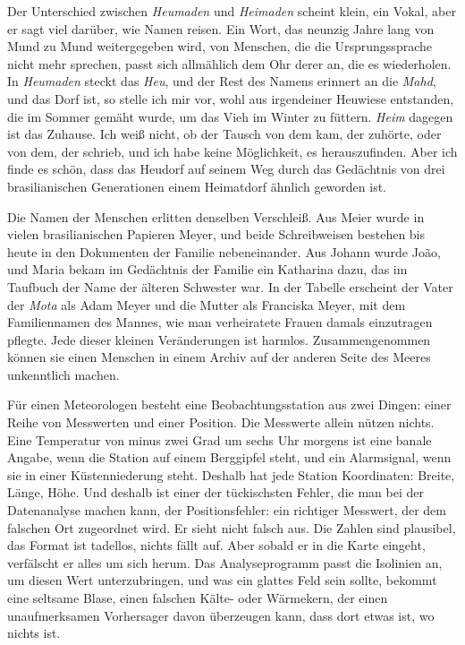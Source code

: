 \documentclass[
  ngerman,
  11pt,
  openany]{book}
\begin{document}
Der Unterschied zwischen \emph{Heumaden} und \emph{Heimaden} scheint
klein, ein Vokal, aber er sagt viel darüber, wie Namen reisen. Ein Wort,
das neunzig Jahre lang von Mund zu Mund weitergegeben wird, von
Menschen, die die Ursprungssprache nicht mehr sprechen, passt sich
allmählich dem Ohr derer an, die es wiederholen. In \emph{Heumaden}
steckt das \emph{Heu}, und der Rest des Namens erinnert an die
\emph{Mahd}, und das Dorf ist, so stelle ich mir vor, wohl aus
irgendeiner Heuwiese entstanden, die im Sommer gemäht wurde, um das Vieh
im Winter zu füttern. \emph{Heim} dagegen ist das Zuhause. Ich weiß
nicht, ob der Tausch von dem kam, der zuhörte, oder von dem, der
schrieb, und ich habe keine Möglichkeit, es herauszufinden. Aber ich
finde es schön, dass das Heudorf auf seinem Weg durch das Gedächtnis von
drei brasilianischen Generationen einem Heimatdorf ähnlich geworden ist.

Die Namen der Menschen erlitten denselben Verschleiß. Aus Meier wurde in
vielen brasilianischen Papieren Meyer, und beide Schreibweisen bestehen
bis heute in den Dokumenten der Familie nebeneinander. Aus Johann wurde
João, und Maria bekam im Gedächtnis der Familie ein Katharina dazu, das
im Taufbuch der Name der älteren Schwester war. In der Tabelle erscheint
der Vater der \emph{Mota} als Adam Meyer und die Mutter als Franciska
Meyer, mit dem Familiennamen des Mannes, wie man verheiratete Frauen
damals einzutragen pflegte. Jede dieser kleinen Veränderungen ist
harmlos. Zusammengenommen können sie einen Menschen in einem Archiv auf
der anderen Seite des Meeres unkenntlich machen.

Für einen Meteorologen besteht eine Beobachtungsstation aus zwei Dingen:
einer Reihe von Messwerten und einer Position. Die Messwerte allein
nützen nichts. Eine Temperatur von minus zwei Grad um sechs Uhr morgens
ist eine banale Angabe, wenn die Station auf einem Berggipfel steht, und
ein Alarmsignal, wenn sie in einer Küstenniederung steht. Deshalb hat
jede Station Koordinaten: Breite, Länge, Höhe. Und deshalb ist einer der
tückischsten Fehler, die man bei der Datenanalyse machen kann, der
Positionsfehler: ein richtiger Messwert, der dem falschen Ort zugeordnet
wird. Er sieht nicht falsch aus. Die Zahlen sind plausibel, das Format
ist tadellos, nichts fällt auf. Aber sobald er in die Karte eingeht,
verfälscht er alles um sich herum. Das Analyseprogramm passt die
Isolinien an, um diesen Wert unterzubringen, und was ein glattes Feld
sein sollte, bekommt eine seltsame Blase, einen falschen Kälte- oder
Wärmekern, der einen unaufmerksamen Vorhersager davon überzeugen kann,
dass dort etwas ist, wo nichts ist.
\end{document}
